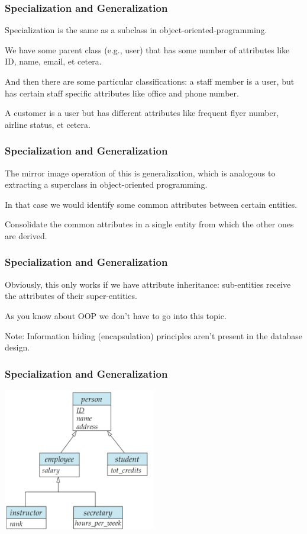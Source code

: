 \begin{frame}
\frametitle{Specialization and Generalization}

\alert{Specialization} is the same as a subclass in object-oriented-programming.

 We have some parent class (e.g., user) that has some number of attributes like ID, name, email, et cetera. 
 
 And then there are some particular classifications: a staff member is a user, but has certain staff specific attributes like office and phone number. 
 
 A customer is a user but has different attributes like frequent flyer number, airline status, et cetera. 

\end{frame}




\begin{frame}
\frametitle{Specialization and Generalization}

The mirror image operation of this is generalization, which is analogous to extracting a superclass in object-oriented programming. 

In that case we would identify some common attributes between certain entities. 

Consolidate the common attributes in a single entity from which the other ones are derived.

\end{frame}



\begin{frame}
\frametitle{Specialization and Generalization}
Obviously, this only works if we have attribute inheritance: sub-entities receive the attributes of their super-entities. 

As you know about OOP we don't have to go into this topic.


Note: Information hiding (encapsulation) principles aren't present in the database design.


\end{frame}



\begin{frame}
\frametitle{Specialization and Generalization}

\begin{center}
\includegraphics[width=0.5\textwidth]{images/specialization-generalization}\end{center}

\end{frame}




